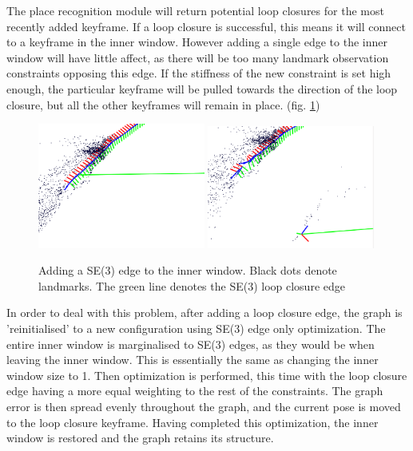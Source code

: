 The place recognition module will return potential loop closures for the most recently added keyframe.  If a loop closure is successful, this means it will connect to a keyframe in the inner window.  However adding a single edge to the inner window will have little affect, as there will be too many landmark observation constraints opposing this edge.  If the stiffness of the new constraint is set high enough, the particular keyframe will be pulled towards the direction of the loop closure, but all the other keyframes will remain in place. (fig. \ref{fig:graph_fail})

\begin{figure}[H]
  \centering
    \includegraphics[width=0.49\textwidth]{chapters/images/before_opt}
    \includegraphics[width=0.49\textwidth]{chapters/images/after_opt}
  \caption{Adding a SE(3) edge to the inner window.  Black dots denote landmarks.  The green line denotes the SE(3) loop closure edge}
  \label{fig:graph_fail}
\end{figure}

In order to deal with this problem, after adding a loop closure edge, the graph is 'reinitialised' to a new configuration using SE(3) edge only optimization.  The entire inner window is marginalised to SE(3) edges, as they would be when leaving the inner window.  This is essentially the same as changing the inner window size to 1.  Then optimization is performed, this time with the loop closure edge having a more equal weighting to the rest of the constraints.  The graph error is then spread evenly throughout the graph, and the current pose is moved to the loop closure keyframe.  Having completed this optimization, the inner window is restored and the graph retains its structure.

